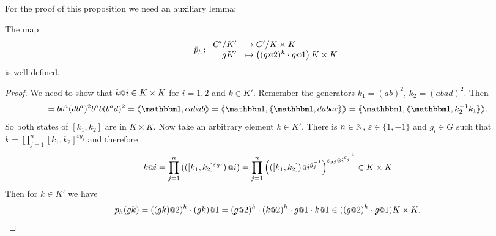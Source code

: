 \documentclass[a4paper,11pt]{amsart}
\begin{document}
\noindent For the proof of this proposition we need an auxiliary lemma:
%
%  
\begin{lem} \label{lem:pIsDefinedModK'}
 The map 
 \[\bar p_h\colon\begin{array}{rl} \RNK{G'}{K'} &\to \RNK{G'}{K\times K}\\
  gK'&\mapsto \left((g\at{2})^h\cdot g\at{1}\right){K\times K}
 \end{array}\]
is well defined.
\end{lem}
\begin{proof}
We need to show that $k\at{i} \in K\times K$ for $i=1,2$ and $k\in K'$. Remember the generators $k_1=(ab)^2$, $k_2=(abad)^2$. Then 
\begin{align*}
 [k_1,k_2]=bb^a(db^a)^2b^ab(b^ad)^2 = \pair{\id,cabab}=\pair{\id,\pair{\id,dabac}}=\pair{\id,\pair{\id,k_2^{-1}k_1}}.
\end{align*}
So both states of $[k_1,k_2]$ are in $K\times K$. Now take an arbitrary element $k\in K'$.
There is $n\in\mathbb{N}$, $\varepsilon \in \{1,-1\}$ and $g_i\in G$ such that 
$k=\prod_{j=1}^n [k_1,k_2]^{\varepsilon g_j}$
and therefore 
\[k\at{i}=\prod_{j=1}^n\left( \left([k_1,k_2]^{\varepsilon g_j}\right)\at{i}\right)
	 = \prod_{j=1}^n \left(([k_1,k_2])\at{i^{g_j^{-1}}}\right)^{\varepsilon g_j\at{i^{g_j^{-1}}}}\in K\times K\]
 Then for $k\in K'$ we have
 \[p_h(gk) = ((gk)\at{2})^h\cdot (gk)\at{1} = (g\at{2})^h\cdot (k\at{2})^h\cdot g\at{1}\cdot k\at{1}\in ((g\at{2})^h\cdot g\at{1})K\times K.\]
\end{proof}
\end{document}
